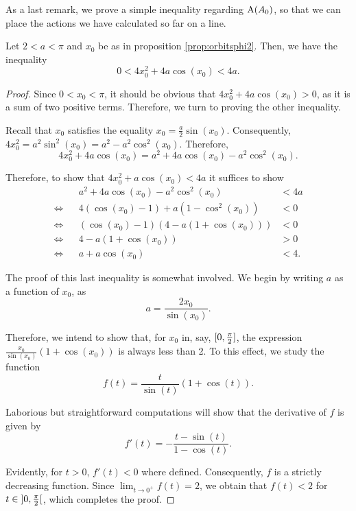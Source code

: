 As a last remark, we prove a simple inequality regarding $\AA(A_0)$, so that we can place the actions we have calculated so far on a line.

\begin{prop}
Let $2 < a < \pi$ and $x_0$ be as in proposition \ref{prop:orbitsphi2}. Then, we have the inequality
\begin{equation}
0 < 4 x_0^2 + 4 a \cos(x_0) < 4a.
\end{equation}
\end{prop}

\begin{proof}
Since $0 < x_0 < \pi$, it should be obvious that $4 x_0^2 + 4 a \cos(x_0) > 0$, as it is a sum of two positive terms. Therefore, we turn to proving the other inequality.

Recall that $x_0$ satisfies the equality $x_0 = \frac a 2 \sin(x_0)$. Consequently, $4 x_0^2 = a^2 \sin^2 (x_0) = a^2 - a^2 \cos^2(x_0)$. Therefore,
\begin{equation}
4 x_0^2 + 4 a \cos(x_0) = a^2 + 4 a \cos(x_0) - a^2 \cos^2(x_0).
\end{equation}

Therefore, to show that $4 x_0^2 + a \cos(x_0) < 4a$ it suffices to show
\begin{equation}
\begin{aligned}
&& a^2 + 4 a \cos(x_0) - a^2 \cos^2(x_0) &< 4a\\
\iff&& 4 (\cos(x_0)-1) + a(1 - \cos^2(x_0)) &< 0\\
\iff&& (\cos(x_0) - 1)(4 - a(1 + \cos(x_0))) &< 0\\
\iff&& 4 - a(1+ \cos(x_0)) &> 0\\
\iff&& a + a \cos(x_0) &< 4.
\end{aligned}
\end{equation}

The proof of this last inequality is somewhat involved. We begin by writing $a$ as a function of $x_0$, as
\begin{equation}
a = \frac{2 x_0}{\sin(x_0)}.
\end{equation}

Therefore, we intend to show that, for $x_0$ in, say, $\interval 0 {\frac \pi 2}$, the expression $\frac{x_0}{\sin(x_0)}(1 + \cos(x_0))$ is always less than 2. To this effect, we study the function
\begin{equation}
f(t) = \frac{t}{\sin(t)}(1 + \cos(t)).
\end{equation}

Laborious but straightforward computations will show that the derivative of $f$ is given by
\begin{equation}
f'(t) = - \frac{t - \sin(t)}{1 - \cos(t)}.
\end{equation}

Evidently, for $t > 0$, $f'(t) < 0$ where defined. Consequently, $f$ is a strictly decreasing function. Since $\lim_{t \to 0^+} f(t) = 2$, we obtain that $f(t) < 2$ for $t \in \ointerval 0 {\frac \pi 2}$, which completes the proof.
\end{proof}

